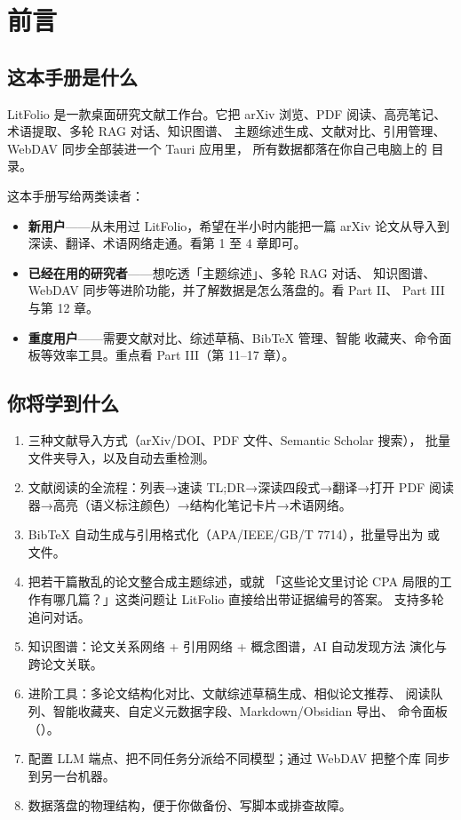 \chapter*{前言}

\section*{这本手册是什么}

LitFolio 是一款桌面研究文献工作台。它把
arXiv 浏览、PDF 阅读、高亮笔记、术语提取、多轮 RAG 对话、知识图谱、
主题综述生成、文献对比、引用管理、WebDAV 同步全部装进一个 Tauri 应用里，
所有数据都落在你自己电脑上的  目录。

这本手册写给两类读者：

\begin{itemize}
  \item \textbf{新用户}——从未用过 LitFolio，希望在半小时内能把一篇
    arXiv 论文从导入到深读、翻译、术语网络走通。看第 1 至 4 章即可。
  \item \textbf{已经在用的研究者}——想吃透「主题综述」、多轮 RAG 对话、
    知识图谱、WebDAV 同步等进阶功能，并了解数据是怎么落盘的。看 Part II、
    Part III 与第 12 章。
  \item \textbf{重度用户}——需要文献对比、综述草稿、BibTeX 管理、智能
    收藏夹、命令面板等效率工具。重点看 Part III（第 11--17 章）。
\end{itemize}

\section*{你将学到什么}

\begin{enumerate}
  \item 三种文献导入方式（arXiv/DOI、PDF 文件、Semantic Scholar 搜索），
    批量文件夹导入，以及自动去重检测。
  \item 文献阅读的全流程：列表→速读 TL;DR→深读四段式→翻译→打开 PDF
    阅读器→高亮（语义标注颜色）→结构化笔记卡片→术语网络。
  \item BibTeX 自动生成与引用格式化（APA/IEEE/GB/T 7714），批量导出为
     或  文件。
  \item 把若干篇散乱的论文整合成主题综述，或就 「这些论文里讨论 CPA
    局限的工作有哪几篇？」这类问题让 LitFolio 直接给出带证据编号的答案。
    支持多轮追问对话。
  \item 知识图谱：论文关系网络 + 引用网络 + 概念图谱，AI 自动发现方法
    演化与跨论文关联。
  \item 进阶工具：多论文结构化对比、文献综述草稿生成、相似论文推荐、
    阅读队列、智能收藏夹、自定义元数据字段、Markdown/Obsidian 导出、
    命令面板（）。
  \item 配置 LLM 端点、把不同任务分派给不同模型；通过 WebDAV 把整个库
    同步到另一台机器。
  \item 数据落盘的物理结构，便于你做备份、写脚本或排查故障。
\end{enumerate}

